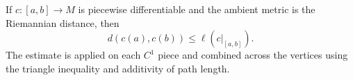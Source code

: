 \begin{lemma}
  \label{lem:dc-ch3-3-1-edist}


  If $c:[a,b]\to M$ is piecewise differentiable and the ambient metric is the
  Riemannian distance, then
  $$
    d(c(a),c(b))\leq \ell(c|_{[a,b]}).
  $$
  The estimate is applied on each $C^1$ piece and combined across the vertices
  using the triangle inequality and additivity of path length.
\end{lemma}
